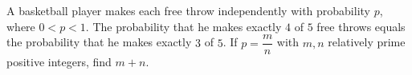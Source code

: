 A basketball player makes each free throw independently with probability \(p\), where \(0<p<1\). The probability that he makes exactly \(4\) of \(5\) free throws equals the probability that he makes exactly \(3\) of \(5\). If \(p=\dfrac {m}{n}\) with \(m,n\) relatively prime positive integers, find \(m+n\).
